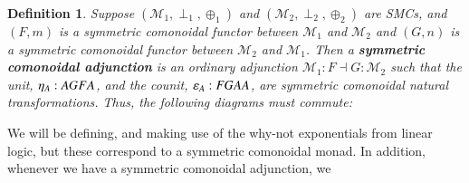 \documentclass{lmcs}
\newtheorem{definition}[theorem]{Definition}
\let\to\relax
\newcommand{\to}{\rightarrow}
\newcommand{\cat}[1]{\mathcal{#1}}
\newcommand{\p}[1]{\mathsf{p}_{#1}}
\newcommand{\q}[1]{\mathsf{q}_{#1}}
\begin{document}
\begin{definition}
  \label{def:coSMCADJ}
  Suppose $(\cat{M}_1,\perp_1,\oplus_1)$ and $(\cat{M}_2,\perp_2,\oplus_2)$
  are SMCs, and $(F,m)$ is a symmetric comonoidal functor between
  $\cat{M}_1$ and $\cat{M}_2$ and $(G,n)$ is a symmetric comonoidal
  functor between $\cat{M}_2$ and $\cat{M}_1$.  Then a
  \textbf{symmetric comonoidal adjunction} is an ordinary adjunction
  $\cat{M}_1 : F \dashv G : \cat{M}_2$ such that the unit,
  $\eta_A : A \to GFA$, and the counit, $\varepsilon_A : FGA \to A$, are
  symmetric comonoidal natural transformations.  Thus, the following
  diagrams must commute:
\end{definition}
We will be defining, and making use of the why-not exponentials from
linear logic, but these correspond to a symmetric comonoidal monad.
In addition, whenever we have a symmetric comonoidal adjunction, we
\end{document}
